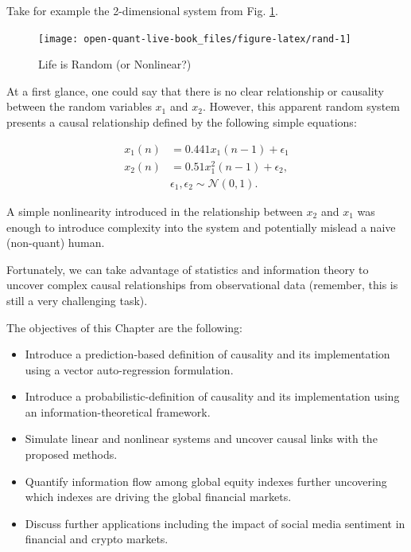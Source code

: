 \documentclass[]{book}
\providecommand{\tightlist}{%
  \setlength{\itemsep}{0pt}\setlength{\parskip}{0pt}}
\theoremstyle{definition}
\theoremstyle{definition}
\theoremstyle{definition}
\theoremstyle{remark}
\begin{document}
Take for example the 2-dimensional system from Fig. \ref{fig:rand}.

\begin{figure}[H]

{\centering \texttt{[image: open-quant-live-book\_files/figure-latex/rand-1]} 

}

\caption{Life is Random (or Nonlinear?)}\label{fig:rand}
\end{figure}

At a first glance, one could say that there is no clear relationship or
causality between the random variables \(x_1\) and \(x_2\). However,
this apparent random system presents a causal relationship defined by
the following simple equations:

\begin{align*}
x_1(n) &= 0.441x_1(n-1) + \epsilon_1 \\
x_2(n) &= 0.51x_1^2(n-1) + \epsilon_2, \\ 
&\epsilon_1, \epsilon_2 \sim \mathcal{N}(0,1).
\end{align*}

A simple nonlinearity introduced in the relationship between \(x_2\) and
\(x_1\) was enough to introduce complexity into the system and
potentially mislead a naive (non-quant) human.

Fortunately, we can take advantage of statistics and information theory
to uncover complex causal relationships from observational data
(remember, this is still a very challenging task).

The objectives of this Chapter are the following:

\begin{itemize}
\tightlist
\item
  Introduce a prediction-based definition of causality and its
  implementation using a vector auto-regression formulation.
\item
  Introduce a probabilistic-definition of causality and its
  implementation using an information-theoretical framework.
\item
  Simulate linear and nonlinear systems and uncover causal links with
  the proposed methods.
\item
  Quantify information flow among global equity indexes further
  uncovering which indexes are driving the global financial markets.
\item
  Discuss further applications including the impact of social media
  sentiment in financial and crypto markets.
\end{itemize}
\end{document}

